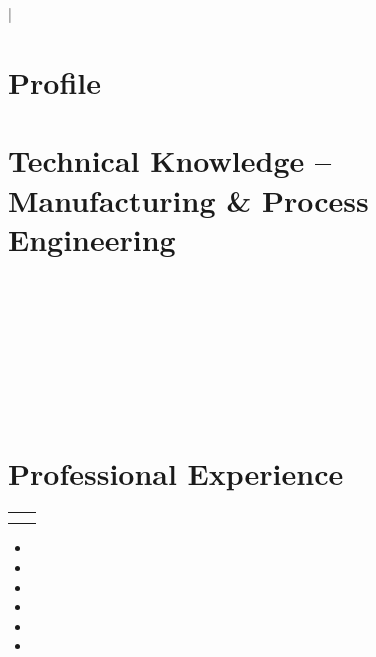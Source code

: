 \documentclass[a4paper,10pt]{article}
\makeatletter
\newcommand{\resumeSubheading}[4]{
    \begin{tabularx}{\textwidth}{@{}X r@{}}
        \textbf{#1} & #2 \\
        \textit{#3} & \textit{#4}
    \end{tabularx}
    \vspace{2pt}
}
\newcommand{\skillrow}[2]{
    \textbf{#1} #2\\[2pt]
}
\makeatother
\begin{document}
\begin{center}

{\LARGE \textbf{}}\\[4pt]

 \\
\href{mailto:}{}
\;|\;
\\[5pt]

\textbf{}

\end{center}

\vspace{-3pt}

\section*{Profile}

\section*{Technical Knowledge -- Manufacturing \& Process Engineering}

\skillrow{}{}

\skillrow{}{}

\skillrow{}{}

\skillrow{}{}

\skillrow{}{}

\skillrow{}{}

\skillrow{}{}

\section*{Professional Experience}

\resumeSubheading{}{}{}{}

\begin{itemize}

\item

\item

\item

\item

\item

\item

\end{itemize}
\end{document}
